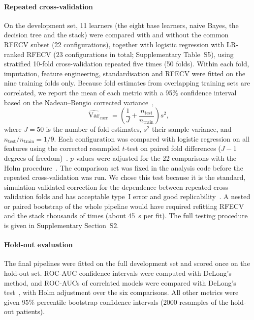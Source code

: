 \documentclass[preprint,12pt,authoryear=false]{elsarticle}
\begin{document}
\paragraph{Repeated cross-validation}
On the development set, 11 learners (the eight base learners, naive Bayes, the decision tree and the stack) were compared with and without the common RFECV subset (22 configurations), together with logistic regression with LR-ranked RFECV (23 configurations in total; Supplementary Table~S5), using stratified 10-fold cross-validation repeated five times (50 folds). Within each fold, imputation, feature engineering, standardisation and RFECV were fitted on the nine training folds only. Because fold estimates from overlapping training sets are correlated, we report the mean of each metric with a 95\% confidence interval based on the Nadeau--Bengio corrected variance~\cite{nadeau2003inference},
\begin{equation}
  \widehat{\operatorname{Var}}_{\mathrm{corr}} = \left(\frac{1}{J} + \frac{n_{\mathrm{test}}}{n_{\mathrm{train}}}\right) s^2,
  \label{eq:corrected}
\end{equation}
where $J=50$ is the number of fold estimates, $s^2$ their sample variance, and $n_{\mathrm{test}}/n_{\mathrm{train}} = 1/9$. Each configuration was compared with logistic regression on all features using the corrected resampled $t$-test on paired fold differences ($J-1$ degrees of freedom)~\cite{nadeau2003inference,bouckaert2004replicability}. $p$-values were adjusted for the 22 comparisons with the Holm procedure~\cite{holm1979}. The comparison set was fixed in the analysis code before the repeated cross-validation was run. We chose this test because it is the standard, simulation-validated correction for the dependence between repeated cross-validation folds and has acceptable type~I error and good replicability~\cite{nadeau2003inference,bouckaert2004replicability}. A nested or paired bootstrap of the whole pipeline would have required refitting RFECV and the stack thousands of times (about 45~s per fit). The full testing procedure is given in Supplementary Section~S2.

\paragraph{Hold-out evaluation}
The final pipelines were fitted on the full development set and scored once on the hold-out set. ROC-AUC confidence intervals were computed with DeLong's method, and ROC-AUCs of correlated models were compared with DeLong's test~\cite{delong1988,sun2014delong}, with Holm adjustment over the six comparisons. All other metrics were given 95\% percentile bootstrap confidence intervals (2000 resamples of the hold-out patients).
\end{document}

